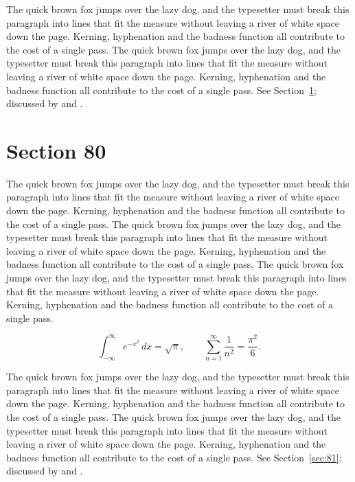 \documentclass{article}
\begin{document}
The quick brown fox jumps over the lazy dog, and the typesetter must break this paragraph into lines that fit the measure without leaving a river of white space down the page. Kerning, hyphenation and the badness function all contribute to the cost of a single pass. The quick brown fox jumps over the lazy dog, and the typesetter must break this paragraph into lines that fit the measure without leaving a river of white space down the page. Kerning, hyphenation and the badness function all contribute to the cost of a single pass. 
See Section~\ref{sec:80}; discussed by \textcite{k5} and \textcite{l2}.
\section{Section 80}
\label{sec:80}
The quick brown fox jumps over the lazy dog, and the typesetter must break this paragraph into lines that fit the measure without leaving a river of white space down the page. Kerning, hyphenation and the badness function all contribute to the cost of a single pass. The quick brown fox jumps over the lazy dog, and the typesetter must break this paragraph into lines that fit the measure without leaving a river of white space down the page. Kerning, hyphenation and the badness function all contribute to the cost of a single pass. The quick brown fox jumps over the lazy dog, and the typesetter must break this paragraph into lines that fit the measure without leaving a river of white space down the page. Kerning, hyphenation and the badness function all contribute to the cost of a single pass. 

\begin{equation}\label{eq:80}
\int_{-\infty}^{\infty} e^{-x^{2}}\,dx = \sqrt{\pi}, \qquad
\sum_{n=1}^{\infty} \frac{1}{n^{2}} = \frac{\pi^{2}}{6}.
\end{equation}

The quick brown fox jumps over the lazy dog, and the typesetter must break this paragraph into lines that fit the measure without leaving a river of white space down the page. Kerning, hyphenation and the badness function all contribute to the cost of a single pass. The quick brown fox jumps over the lazy dog, and the typesetter must break this paragraph into lines that fit the measure without leaving a river of white space down the page. Kerning, hyphenation and the badness function all contribute to the cost of a single pass. 
See Section~\ref{sec:81}; discussed by \textcite{k1} and \textcite{l3}.
\end{document}
